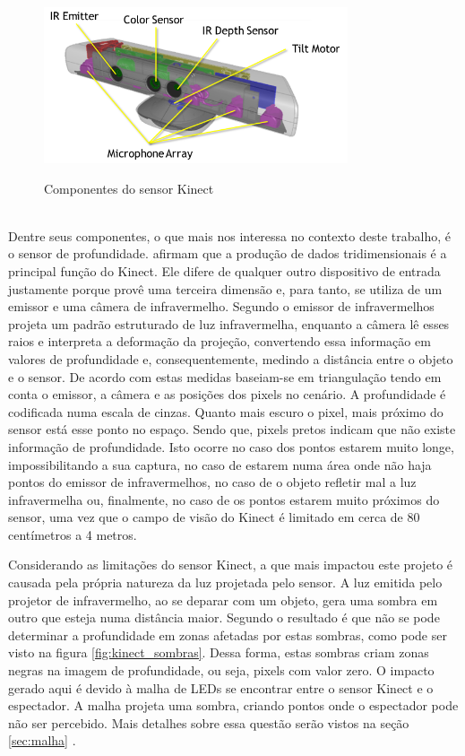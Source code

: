 \begin{figure}[H]
    \centering
    \caption{Componentes do sensor Kinect}
	\vspace*{0,2cm}
    \includegraphics[width=0.8\textwidth]{./04-figuras/kinect_componentes}
    \label{fig:kinect_componentes}
\end{figure}
\vspace*{-0,9cm}
{\raggedright {}}\\

Dentre seus componentes, o que mais nos interessa no contexto deste trabalho, é o sensor de profundidade.  afirmam que a produção de dados tridimensionais é a principal função do Kinect. Ele difere de qualquer outro dispositivo de entrada justamente porque provê uma terceira dimensão e, para tanto, se utiliza de um emissor e uma câmera de infravermelho. Segundo  o emissor de infravermelhos projeta um padrão estruturado de luz infravermelha, enquanto a câmera lê esses raios e interpreta a deformação da projeção, convertendo essa informação em valores de profundidade e, consequentemente, medindo a distância entre o objeto e o sensor. De acordo com  estas medidas baseiam-se em triangulação tendo em conta o emissor, a câmera e as posições dos pixels no cenário. A profundidade é codificada numa escala de cinzas. Quanto mais escuro o pixel, mais próximo do sensor está esse ponto no espaço. Sendo que, pixels pretos indicam que não existe informação de profundidade. Isto ocorre no caso dos pontos estarem muito longe, impossibilitando a sua captura, no caso de estarem numa área onde não haja pontos do emissor de infravermelhos, no caso de o objeto refletir mal a luz infravermelha ou, finalmente, no caso de os pontos estarem muito próximos do sensor, uma vez que o campo de visão do Kinect é limitado em cerca de 80 centímetros a 4 metros.

Considerando as limitações do sensor Kinect, a que mais impactou este projeto é causada pela própria natureza da luz projetada pelo sensor. A luz emitida pelo projetor de infravermelho, ao se deparar com um objeto, gera uma sombra em outro que esteja numa distância maior. Segundo  o resultado é que não se pode determinar a profundidade em zonas afetadas por estas sombras, como pode ser visto na figura \ref{fig:kinect_sombras}. Dessa forma, estas sombras criam zonas negras na imagem de profundidade, ou seja, pixels com valor zero. O impacto gerado aqui é devido à malha de LEDs se encontrar entre o sensor Kinect e o espectador. A malha projeta uma sombra, criando pontos onde o espectador pode não ser percebido.  Mais detalhes sobre essa questão serão vistos na seção \ref{sec:malha} .

